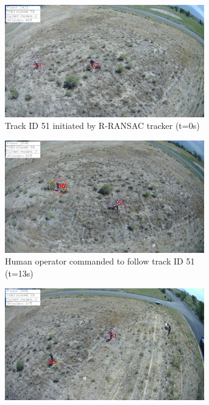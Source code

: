 \begin{figure}[htbp]
	\begin{subfigure}{0.48\linewidth}
		\centering
		\includegraphics[width=0.95\textwidth]{images/chapter3/ID51_track_begin.png}
		\caption{Track ID 51 initiated by R-RANSAC tracker (t=0s)}
		\label{camera1}
	\end{subfigure}
	\begin{subfigure}{0.48\linewidth}
		\centering
		\includegraphics[width=0.95\textwidth]{images/chapter3/ID51_follow_begin.png}
		\caption{Human operator commanded to follow track ID 51 (t=13s)}
		\label{camera2}
	\end{subfigure}
	\begin{subfigure}{0.48\linewidth}
		\centering
		\includegraphics[width=0.95\textwidth]{images/chapter3/ID65_track_begin.png}

\end{subfigure}
\end{figure}
